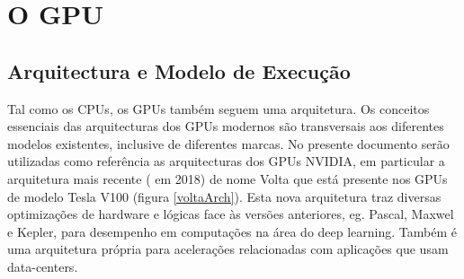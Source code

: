 \section{O GPU}
\label{gpus}

\subsection{Arquitectura e Modelo de Execução}
\label{gpuArch}
Tal como os CPUs, os GPUs também seguem uma arquitetura. Os conceitos essenciais das arquitecturas dos GPUs modernos são transversais aos diferentes modelos existentes, inclusive de diferentes marcas. No presente documento serão utilizadas como referência as arquitecturas dos GPUs NVIDIA, em particular a arquitetura mais recente ( em 2018) de nome Volta\cite{voltaArch} que está presente nos GPUs de modelo Tesla V100 (figura \ref{voltaArch}). Esta nova arquitetura traz diversas optimizações de hardware e lógicas face às versões anteriores, eg. Pascal, Maxwel e Kepler, para desempenho em computações na área do deep learning. Também é uma arquitetura própria para acelerações relacionadas com aplicações que usam data-centers.


